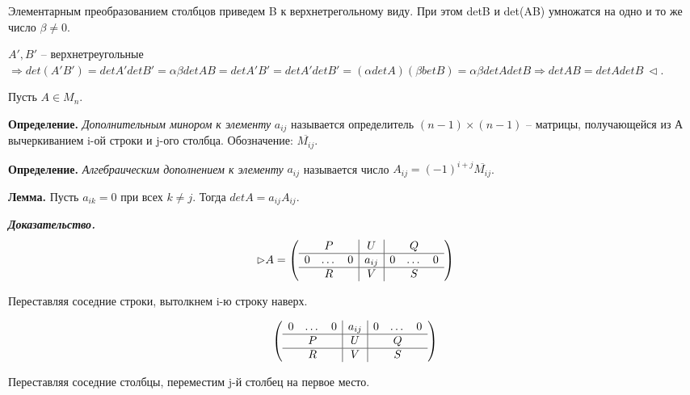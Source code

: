 Элементарным преобразованием столбцов приведем B к верхнетрегольному виду. При этом detB и det(AB) умножатся на одно и то же число $\beta \neq 0$.


\vspace{\baselineskip}
$A', B'$ -- верхнетреугольные $\Rightarrow det(A'B') = detA' detB' = \alpha \beta detAB = detA'B' = detA' det B' = (\alpha det A)(\beta bet B) = \alpha \beta det A det B \Rightarrow detAB = detA detB \ \lhd$.

\vspace{\baselineskip}
Пусть $A \in M_n$.

\textbf{Определение.} \textit{Дополнительным минором к элементу} $a_{ij}$ называется определитель $(n-1) \times (n-1)$ -- матрицы, получающейся из А вычеркиванием i-ой строки и j-ого столбца. Обозначение: $\overline{M_{ij}}$.

\vspace{\baselineskip}
\textbf{Определение.} \textit{Алгебраическим дополнением к элементу} $a_{ij}$ называется число $A_{ij} = (-1)^{i+j} \overline{M_{ij}}$.

\vspace{\baselineskip}
\textbf{Лемма.} Пусть $a_{ik} = 0$ при всех $k \neq j$. Тогда $detA = a_{ij}A_{ij}$.

\textbf{\textit{Доказательство.}}
\begin{equation*} \rhd A = 
\left(
\begin{array}{ccc|c|ccc}
  & P & & U & & Q & \\
  \hline
  0 & \dots & 0 & a_{ij} & 0 & \dots & 0 \\
  \hline
  & R & & V & & S &
\end{array}
\right)
\end{equation*}

\vspace{\baselineskip}
Переставляя соседние строки, вытолкнем i-ю строку наверх.

\begin{equation*} 
\left(
\begin{array}{ccc|c|ccc}
	0 & \dots & 0 & a_{ij} & 0 & \dots & 0 \\
  \hline
  & P & & U & & Q & \\
  \hline
  & R & & V & & S &
\end{array}
\right)
\end{equation*}

\vspace{\baselineskip}
Переставляя соседние столбцы, переместим j-й столбец на первое место. 

